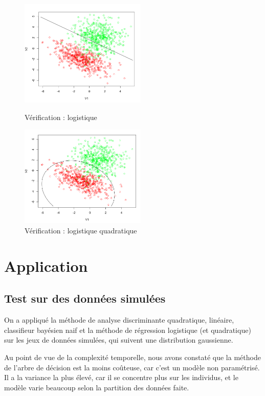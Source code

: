 \documentclass{article}
\begin{document}
\begin{figure}[H]   
  \begin{minipage}[t]{0.5\linewidth} 
    \centering   
    \includegraphics[width=6cm]{img/log1.png}   
    \caption{Vérification : logistique}   
    \label{veri_log1}   
  \end{minipage}%
  \begin{minipage}[t]{0.5\linewidth}   
    \centering   
    \includegraphics[width=6cm]{img/log2.png}   
    \caption{Vérification : logistique quadratique}
    \label{veri_log2}   
  \end{minipage}   
\end{figure}  








\section{Application}




\subsection{Test sur des données simulées}
On a appliqué la méthode de analyse discriminante quadratique, linéaire, classifieur bayésien naif et la méthode de régression logistique (et quadratique) sur les jeux de données simulées, qui suivent une distribution gaussienne.

Au point de vue de la complexité temporelle, nous avons constaté que la méthode de l'arbre de décision est la moins coûteuse, car c'est un modèle non paramétrisé. Il a la variance la plus élevé, car il se concentre plus sur les individus, et le modèle varie beaucoup selon la partition des données faite.
\end{document}
